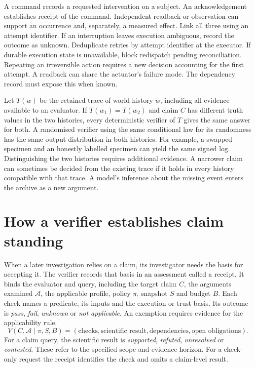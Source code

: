 \documentclass[11pt,a4paper]{article}
\newcommand{\partpage}[1]{\clearpage\section{#1}}
\newcommand{\topic}[1]{\par\smallskip{\sffamily\bfseries\color{ink}#1\par}\nobreak}
\begin{document}
\topic{Actuation and partial failure}
A command records a requested intervention on a subject. An acknowledgement establishes receipt of the command. Independent readback or observation can support an occurrence and, separately, a measured effect. Link all three using an attempt identifier. If an interruption leaves execution ambiguous, record the outcome as unknown. Deduplicate retries by attempt identifier at the executor. If durable execution state is unavailable, block redispatch pending reconciliation. Repeating an irreversible action requires a new decision accounting for the first attempt. A readback can share the actuator's failure mode. The dependency record must expose this when known.

\topic{An observational limit}
Let $T(w)$ be the retained trace of world history $w$, including all evidence available to an evaluator. If $T(w_1)=T(w_2)$ and claim $C$ has different truth values in the two histories, every deterministic verifier of $T$ gives the same answer for both. A randomised verifier using the same conditional law for its randomness has the same output distribution in both histories. For example, a swapped specimen and an honestly labelled specimen can yield the same signed log. Distinguishing the two histories requires additional evidence. A narrower claim can sometimes be decided from the existing trace if it holds in every history compatible with that trace. A model's inference about the missing event enters the archive as a new argument.

\partpage{How a verifier establishes claim standing}\label{sec:receipt}
When a later investigation relies on a claim, its investigator needs the basis for accepting it. The verifier records that basis in an assessment called a receipt. It binds the evaluator and query, including the target claim $C$, the arguments examined $\mathcal A$, the applicable profile, policy $\pi$, snapshot $S$ and budget $B$. Each check names a predicate, its inputs and the execution or trust basis. Its outcome is \emph{pass}, \emph{fail}, \emph{unknown} or \emph{not applicable}. An exemption requires evidence for the applicability rule.
\[
 V(C,\mathcal A\mid\pi,S,B)=(\text{checks},\text{scientific result},\text{dependencies},\text{open obligations}).
\]
For a claim query, the scientific result is \emph{supported}, \emph{refuted}, \emph{unresolved} or \emph{contested}. These refer to the specified scope and evidence horizon. For a check-only request the receipt identifies the check and omits a claim-level result.
\end{document}

